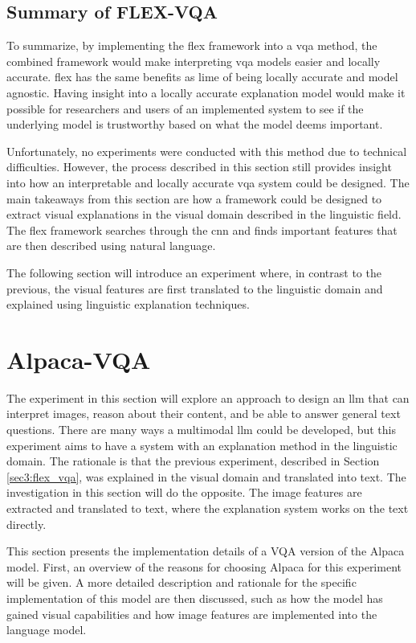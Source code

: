         \subsection{Summary of FLEX-VQA}
        To summarize, by implementing the \gls{flex} framework into a \gls{vqa} method, the combined framework would make interpreting \gls{vqa} models easier and locally accurate. \gls{flex} has the same benefits as \gls{lime} of being locally accurate and model agnostic. Having insight into a locally accurate explanation model would make it possible for researchers and users of an implemented system to see if the underlying model is trustworthy based on what the model deems important. 

        Unfortunately, no experiments were conducted with this method due to technical difficulties. However, the process described in this section still provides insight into how an interpretable and locally accurate \gls{vqa} system could be designed. 
        The main takeaways from this section are how a framework could be designed to extract visual explanations in the visual domain described in the linguistic field. The \gls{flex} framework searches through the \gls{cnn} and finds important features that are then described using natural language. 

        The following section will introduce an experiment where, in contrast to the previous, the visual features are first translated to the linguistic domain and explained using linguistic explanation techniques.

    \section{Alpaca-VQA}
    \label{sec3:alpaca_vqa}

    The experiment in this section will explore an approach to design an \gls{llm} that can interpret images, reason about their content, and be able to answer general text questions. 
    There are many ways a multimodal \gls{llm} could be developed, but this experiment aims to have a system with an explanation method in the linguistic domain. The rationale is that the previous experiment, described in Section \ref{sec3:flex_vqa}, was explained in the visual domain and translated into text. The investigation in this section will do the opposite. The image features are extracted and translated to text, where the explanation system works on the text directly. 

    This section presents the implementation details of a VQA version of the Alpaca model. First, an overview of the reasons for choosing Alpaca for this experiment will be given. A more detailed description and rationale for the specific implementation of this model are then discussed, such as how the model has gained visual capabilities and how image features are implemented into the language model.


